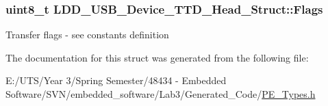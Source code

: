 \subsubsection[{Flags}]{\setlength{\rightskip}{0pt plus 5cm}uint8\+\_\+t L\+D\+D\+\_\+\+U\+S\+B\+\_\+\+Device\+\_\+\+T\+T\+D\+\_\+\+Head\+\_\+\+Struct\+::\+Flags}\label{struct_l_d_d___u_s_b___device___t_t_d___head___struct_a9572bb866ff1f22ed881f3ff618c0445}
Transfer flags -\/ see constants definition 

The documentation for this struct was generated from the following file\+:\begin{DoxyCompactItemize}
\item 
E\+:/\+U\+T\+S/\+Year 3/\+Spring Semester/48434 -\/ Embedded Software/\+S\+V\+N/embedded\+\_\+software/\+Lab3/\+Generated\+\_\+\+Code/\hyperlink{_p_e___types_8h}{P\+E\+\_\+\+Types.\+h}\end{DoxyCompactItemize}
